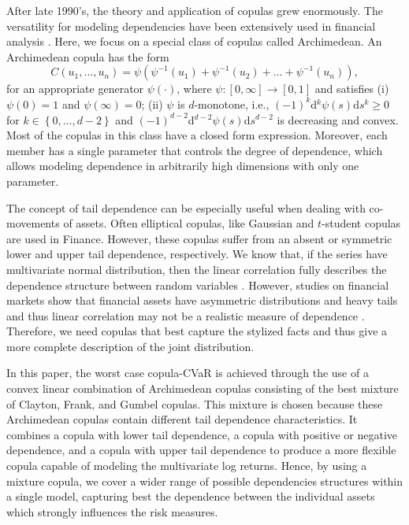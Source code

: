 \documentclass[a4paper,10pt]{article}
\begin{document}
After late 1990's, the theory and application of copulas grew enormously. The versatility for modeling dependencies have been extensively used in financial analysis \citep{cherubini04,patton2006,chan2010,sak2010,laih2014,d2018copula}. Here, we focus on a special class of copulas called Archimedean. An Archimedean copula has the form
\begin{equation}
C\left( u_{1},\ldots,u_{n}\right) =\psi \left( \psi ^{-1}\left( u_{1}\right)
+\psi ^{-1}\left( u_{2}\right) +\ldots+\psi ^{-1}\left( u_{n}\right) \right) ,
\end{equation}%
for an appropriate generator $\psi \left( \cdot \right) $, where $\psi:\left[ 0,\infty \right] \rightarrow \left[ 0,1\right] $ and satisfies (i) $\psi (0)=1$ and $\psi (\infty )=0$; (ii) $\psi $ is $d$-monotone, i.e., $(-1)^{k}$d$^{k}\psi \left( s\right) $d$s^{k}\geq 0$ for $k\in \left\{0,\ldots,d-2\right\} $ and $(-1)^{d-2}$d$^{d-2}\psi \left( s\right) $d$s^{d-2}$ is decreasing and convex. Most of the copulas in this class have a closed form expression. Moreover, each member has a single parameter that controls the degree of dependence, which allows modeling dependence in arbitrarily high dimensions with only one parameter.

The concept of tail dependence can be especially useful when dealing with co-movements of assets. Often elliptical copulas, like Gaussian and $t$-student copulas are used in Finance. However, these copulas suffer from an absent or symmetric lower and upper tail dependence, respectively. We know that, if the series have multivariate normal distribution, then the linear correlation fully describes the dependence structure between random variables \citep{embrechts2001}. However, studies on financial markets show that financial assets have asymmetric distributions and heavy tails and thus linear correlation may not be a realistic measure of dependence \citep{campbell97,artzner1999,cont01,ane03,szego2005,mcneil15}. Therefore, we need copulas that best capture the stylized facts and thus give a more complete description of the joint
distribution.

In this paper, the worst case copula-CVaR is achieved through the use of a convex linear combination of Archimedean copulas consisting of the best mixture of Clayton, Frank, and Gumbel copulas. This mixture is chosen because these Archimedean copulas contain different tail dependence characteristics. It combines a copula with lower tail dependence, a copula with positive or negative dependence, and a copula with upper tail dependence to produce a more flexible copula capable of modeling the multivariate log returns. Hence, by using a mixture copula, we cover a wider range of possible dependencies structures within a single model, capturing best the dependence between the individual assets which strongly influences the risk measures.
\end{document}

